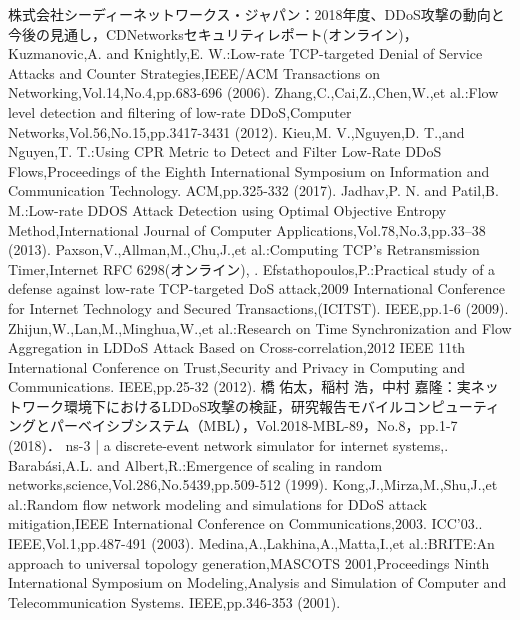 \documentclass[Japanese]{dicomopapers}
\begin{document}
\begin{thebibliography}{99}
     株式会社シーディーネットワークス・ジャパン：2018年度、DDoS攻撃の動向と今後の見通し，CDNetworksセキュリティレポート(オンライン)， 
     Kuzmanovic,A. and Knightly,E. W.:Low-rate TCP-targeted Denial of Service Attacks and Counter Strategies,IEEE/ACM Transactions on Networking,Vol.14,No.4,pp.683-696 (2006).
     Zhang,C.,Cai,Z.,Chen,W.,et al.:Flow level detection and filtering of low-rate DDoS,Computer Networks,Vol.56,No.15,pp.3417-3431 (2012).
     Kieu,M. V.,Nguyen,D. T.,and Nguyen,T. T.:Using CPR Metric to Detect and Filter Low-Rate DDoS Flows,Proceedings of the Eighth International Symposium on Information and Communication Technology. ACM,pp.325-332 (2017).
     Jadhav,P. N. and Patil,B. M.:Low-rate DDOS Attack Detection using Optimal Objective Entropy Method,International Journal of Computer Applications,Vol.78,No.3,pp.33–38 (2013).
     Paxson,V.,Allman,M.,Chu,J.,et al.:Computing TCP's Retransmission Timer,Internet RFC 6298(オンライン), .
     Efstathopoulos,P.:Practical study of a defense against low-rate TCP-targeted DoS attack,2009 International Conference for Internet Technology and Secured Transactions,(ICITST). IEEE,pp.1-6 (2009).
     Zhijun,W.,Lan,M.,Minghua,W.,et al.:Research on Time Synchronization and Flow Aggregation in LDDoS Attack Based on Cross-correlation,2012 IEEE 11th International Conference on Trust,Security and Privacy in Computing and Communications. IEEE,pp.25-32 (2012).
     橋 佑太，稲村 浩，中村 嘉隆：実ネットワーク環境下におけるLDDoS攻撃の検証，研究報告モバイルコンピューティングとパーベイシブシステム（MBL），Vol.2018-MBL-89，No.8，pp.1-7 (2018)．
     ns-3 | a discrete-event network simulator for internet systems,.
     Barab{\'a}si,A.L. and Albert,R.:Emergence of scaling in random networks,science,Vol.286,No.5439,pp.509-512 (1999).
     Kong,J.,Mirza,M.,Shu,J.,et al.:Random flow network modeling and simulations for DDoS attack mitigation,IEEE International Conference on Communications,2003. ICC'03.. IEEE,Vol.1,pp.487-491 (2003).
     Medina,A.,Lakhina,A.,Matta,I.,et al.:BRITE:An approach to universal topology generation,MASCOTS 2001,Proceedings Ninth International Symposium on Modeling,Analysis and Simulation of Computer and Telecommunication Systems. IEEE,pp.346-353 (2001).

\end{thebibliography}
\end{document}
